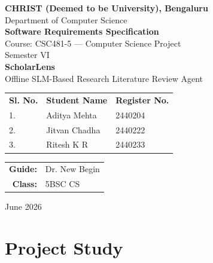 \documentclass[12pt,a4paper]{article}
\begin{document}
\begin{titlepage}
    \centering
    \vspace*{0.5cm}

    {\large\bfseries CHRIST (Deemed to be University), Bengaluru}\\[4pt]
    {\normalsize Department of Computer Science}\\[1.5cm]

    {\LARGE\bfseries Software Requirements Specification}\\[0.4cm]
    {\large Course: CSC481-5 --- Computer Science Project}\\[0.3cm]
    {\large Semester VI}\\[2cm]

    {\huge\bfseries ScholarLens}\\[0.3cm]
    {\Large Offline SLM-Based Research Literature Review Agent}\\[2.5cm]

    \begin{tabular}{l l l}
        \textbf{Sl. No.} & \textbf{Student Name} & \textbf{Register No.} \\[6pt]
        1. & Aditya Mehta   & 2440204 \\[4pt]
        2. & Jitvan Chadha  & 2440222 \\[4pt]
        3. & Ritesh K R     & 2440233 \\[4pt]
    \end{tabular}

    \vspace{2cm}

    \begin{tabular}{>{\bfseries}r l}
        Guide: & Dr. New Begin \\[4pt]
        Class: & 5BSC CS \\[4pt]
    \end{tabular}

    \vfill
    {\large June 2026}
\end{titlepage}

\tableofcontents
\newpage

\section{Project Study}
\end{document}
